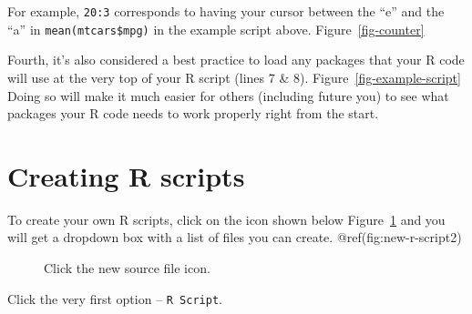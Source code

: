 \documentclass[
  letterpaper,
  DIV=11,
  numbers=noendperiod]{scrreprt}
\begin{document}
For example, \texttt{20:3} corresponds to having your cursor between the
``e'' and the ``a'' in \texttt{mean(mtcars\$mpg)} in the example script
above. Figure~\ref{fig-counter}

Fourth, it's also considered a best practice to load any packages that
your R code will use at the very top of your R script (lines 7 \& 8).
Figure~\ref{fig-example-script} Doing so will make it much easier for
others (including future you) to see what packages your R code needs to
work properly right from the start.

\section{Creating R scripts}\label{creating-r-scripts}

To create your own R scripts, click on the icon shown below
Figure~\ref{fig-new-r-script1} and you will get a dropdown box with a
list of files you can create. @ref(fig:new-r-script2)

\begin{figure}


\caption{\label{fig-new-r-script1}Click the new source file icon.}

\end{figure}%

Click the very first option -- \texttt{R\ Script}.
\end{document}
